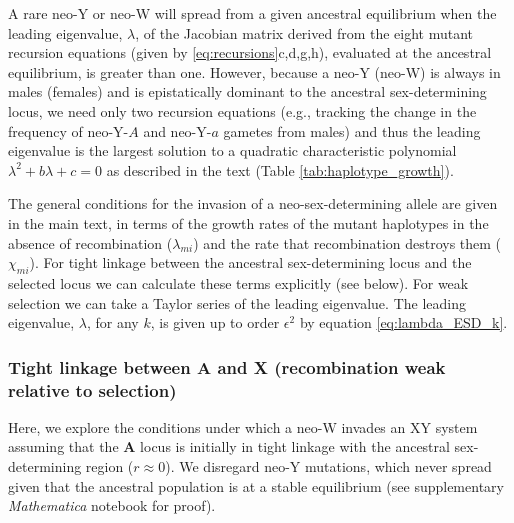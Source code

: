 \documentclass[12pt]{article}
\begin{document}
A rare neo-Y or neo-W will spread from a given ancestral equilibrium when the leading eigenvalue, $\lambda$, of the Jacobian matrix derived from the eight mutant recursion equations (given by \ref{eq:recursions}c,d,g,h), evaluated at the ancestral equilibrium, is greater than one.
However, because a neo-Y (neo-W) is always in males (females) and is epistatically dominant to the ancestral sex-determining locus, we need only two recursion equations (e.g., tracking the change in the frequency of neo-Y-$A$ and neo-Y-$a$ gametes from males) and thus the leading eigenvalue is the largest solution to a quadratic characteristic polynomial $\lambda^2 + b\lambda + c = 0$ as described in the text (Table \ref{tab:haplotype_growth}).

The general conditions for the invasion of a neo-sex-determining allele are given in the main text, in terms of the growth rates of the mutant haplotypes in the absence of recombination ($\lambda_{mi}$) and the rate that recombination destroys them ($\chi_{mi}$).
For tight linkage between the ancestral sex-determining locus and the selected locus we can calculate these terms explicitly (see below).
For weak selection we can take a Taylor series of the leading eigenvalue. 
The leading eigenvalue, $\lambda$, for any $k$, is given up to order $\epsilon^2$ by equation \eqref{eq:lambda_ESD_k}.

\subsubsection*{Tight linkage between \textbf{A} and \textbf{X} (recombination weak relative to selection)}

Here, we explore the conditions under which a neo-W invades an XY system assuming that the \textbf{A} locus is initially in tight linkage with the ancestral sex-determining region ($r \approx 0$). 
We disregard neo-Y mutations, which never spread given that the ancestral population is at a stable equilibrium (see supplementary \textit{Mathematica} notebook for proof). 
\end{document}
